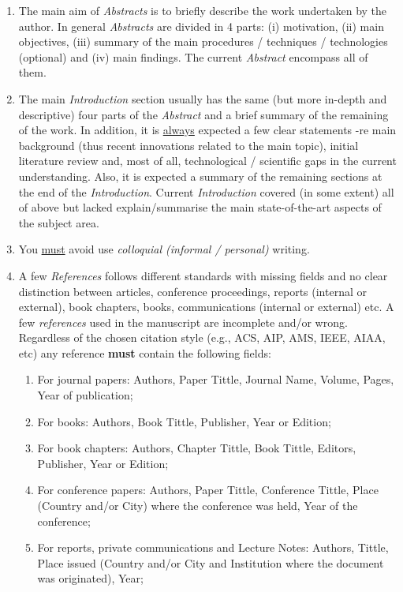 \documentclass[14pt,twoside]{report}
\begin{document}
\begin{enumerate}
%
\item The main aim of {\it Abstracts} is to briefly describe the work undertaken by the author. In general {\it Abstracts} are divided in 4 parts: (i) motivation, (ii) main objectives, (iii) summary of the main procedures / techniques / technologies (optional) and (iv) main findings. The current {\it Abstract} encompass all of them. 
%
\item The main {\it Introduction} section usually has the same (but more in-depth and descriptive) four parts of the {\it Abstract} and a brief summary of the remaining of the work. In addition, it is \underline{always} expected a few clear statements -re main background (thus recent innovations related to the main topic), initial literature review and, most of all, technological / scientific gaps in the current understanding. Also, it is expected a summary of the remaining sections at the end of the {\it Introduction}.  Current {\it Introduction} covered (in some extent) all of above but lacked explain/summarise the main state-of-the-art aspects of the subject area. 
%
\item You \underline{must} avoid use {\it colloquial (informal / personal)} writing.  
%
\item A few {\it References} follows different standards with missing fields and no clear distinction between articles, conference proceedings, reports (internal or external), book chapters, books, communications (internal or external) etc.  A few {\it references} used in the manuscript are incomplete and/or wrong. Regardless of the chosen citation style (e.g., ACS, AIP, AMS, IEEE, AIAA, etc) any reference {\bf must} contain the following fields: 
\begin{enumerate}
\item For journal papers: Authors, Paper Tittle, Journal Name, Volume, Pages, Year of publication;
\item For books: Authors, Book Tittle, Publisher, Year or Edition;
\item For book chapters: Authors, Chapter Tittle, Book Tittle, Editors, Publisher, Year or Edition;
\item For conference papers: Authors, Paper Tittle, Conference Tittle, Place (Country and/or City) where the conference was held, Year of the conference;
\item For reports,  private communications and Lecture Notes: Authors, Tittle, Place issued (Country and/or City and Institution where the document was originated), Year;

\end{enumerate}
\end{enumerate}
\end{document}
